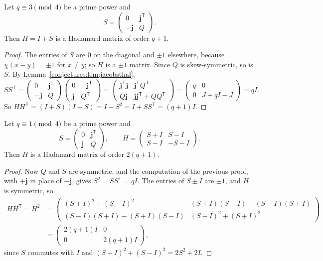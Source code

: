 \begin{theorem}[Paley I, 1933]\label{conjectures:thm:paley1}
Let $q\equiv3\pmod4$ be a prime power and
\[
S=\begin{pmatrix}0&\mathbf j^{\mathsf T}\\-\mathbf j&Q\end{pmatrix}.
\]
Then $H=I+S$ is a Hadamard matrix of order $q+1$.
\end{theorem}
\begin{proof}
The entries of $S$ are $0$ on the diagonal and $\pm1$ elsewhere, because $\chi(x-y)=\pm1$ for $x\neq y$; so $H$ is a $\pm1$ matrix. Since $Q$ is
skew-symmetric, so is $S$. By Lemma~\ref{conjectures:lem:jacobsthal},
\[
SS^{\mathsf T}=\begin{pmatrix}0&\mathbf j^{\mathsf T}\\-\mathbf j&Q\end{pmatrix}\begin{pmatrix}0&-\mathbf j^{\mathsf T}\\\mathbf j&Q^{\mathsf T}\end{pmatrix}
=\begin{pmatrix}\mathbf j^{\mathsf T}\mathbf j&\mathbf j^{\mathsf T}Q^{\mathsf T}\\Q\mathbf j&\mathbf j\mathbf j^{\mathsf T}+QQ^{\mathsf T}\end{pmatrix}
=\begin{pmatrix}q&0\\0&J+qI-J\end{pmatrix}=qI.
\]
So $HH^{\mathsf T}=(I+S)(I-S)=I-S^2=I+SS^{\mathsf T}=(q+1)I$.
\end{proof}

\begin{theorem}[Paley II, 1933]\label{conjectures:thm:paley2}
Let $q\equiv1\pmod4$ be a prime power and
\[
S=\begin{pmatrix}0&\mathbf j^{\mathsf T}\\\mathbf j&Q\end{pmatrix},\qquad H=\begin{pmatrix}S+I&S-I\\S-I&-S-I\end{pmatrix}.
\]
Then $H$ is a Hadamard matrix of order $2(q+1)$.
\end{theorem}
\begin{proof}
Now $Q$ and $S$ are symmetric, and the computation of the previous proof, with $+\mathbf j$ in place of $-\mathbf j$, gives $S^2=SS^{\mathsf T}=qI$. The
entries of $S\pm I$ are $\pm1$, and $H$ is symmetric, so
\[
\begin{aligned}HH^{\mathsf T}=H^2&=\begin{pmatrix}(S+I)^2+(S-I)^2&(S+I)(S-I)-(S-I)(S+I)\\(S-I)(S+I)-(S+I)(S-I)&(S-I)^2+(S+I)^2\end{pmatrix}\\
&=\begin{pmatrix}2(q+1)I&0\\0&2(q+1)I\end{pmatrix},\end{aligned}
\]
since $S$ commutes with $I$ and $(S+I)^2+(S-I)^2=2S^2+2I$.
\end{proof}

